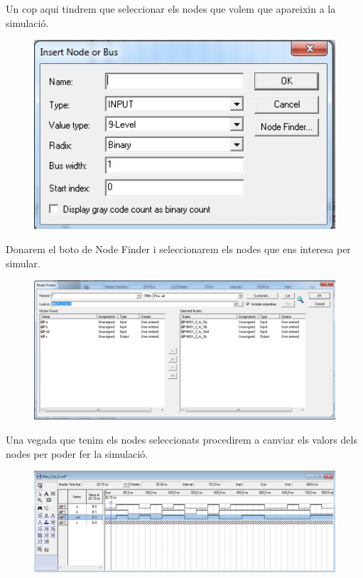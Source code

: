 \documentclass[12pt, a4papre]{article}
\begin{document}
	Un cop aqui tindrem que seleccionar els nodes que volem que apareixin a la simulació.
	\begin{figure}[H]
		\begin{center}
		\includegraphics[width=150mm]{Insertnode.jpeg}
		\end{center}
	\end{figure}
	
	Donarem el boto de  Node Finder i seleccionarem els nodes que ens interesa per simular.
	
		\begin{figure}[H]
		\begin{center}
		\includegraphics[width=150mm]{nodes.jpeg}
		\end{center}
	\end{figure}
	
	Una vegada que tenim els nodes seleccionats procedirem a canviar els valors dels nodes per poder fer la simulació.
	
		\begin{figure}[H]
		\begin{center}
		\includegraphics[width=150mm]{simulacioambvalors.jpeg}
		\end{center}
	\end{figure}
	
\end{document}
